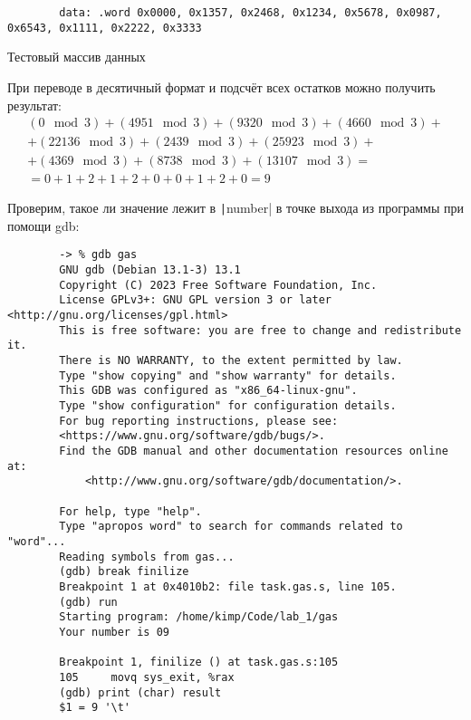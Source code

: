 \documentclass[a4paper]{article}
\begin{document}
  \begin{listing}[H]
    \begin{verbatim}
        data: .word 0x0000, 0x1357, 0x2468, 0x1234, 0x5678, 0x0987, 0x6543, 0x1111, 0x2222, 0x3333
    \end{verbatim}
    \caption{Тестовый массив данных}
  \end{listing}

  При переводе в десятичный формат и подсчёт всех остатков можно получить результат:
  \begin{multline}
    (0\mod 3) +  (4951 \mod 3) + (9320 \mod 3) + (4660 \mod 3) + \\
    + (22136 \mod 3) + (2439 \mod 3) + (25923 \mod 3) + \\
    + (4369 \mod 3) + (8738 \mod 3) + (13107 \mod 3) = \\
    = 0 + 1 + 2 + 1 + 2 + 0 + 0 + 1 + 2 + 0 = 9
  \end{multline}

  Проверим, такое ли значение лежит в \texttt|number|
  в точке выхода из программы при помощи gdb:

  \begin{listing}[H]
    \begin{verbatim}
        -> % gdb gas
        GNU gdb (Debian 13.1-3) 13.1
        Copyright (C) 2023 Free Software Foundation, Inc.
        License GPLv3+: GNU GPL version 3 or later <http://gnu.org/licenses/gpl.html>
        This is free software: you are free to change and redistribute it.
        There is NO WARRANTY, to the extent permitted by law.
        Type "show copying" and "show warranty" for details.
        This GDB was configured as "x86_64-linux-gnu".
        Type "show configuration" for configuration details.
        For bug reporting instructions, please see:
        <https://www.gnu.org/software/gdb/bugs/>.
        Find the GDB manual and other documentation resources online at:
            <http://www.gnu.org/software/gdb/documentation/>.

        For help, type "help".
        Type "apropos word" to search for commands related to "word"...
        Reading symbols from gas...
        (gdb) break finilize 
        Breakpoint 1 at 0x4010b2: file task.gas.s, line 105.
        (gdb) run
        Starting program: /home/kimp/Code/lab_1/gas 
        Your number is 09

        Breakpoint 1, finilize () at task.gas.s:105
        105	    movq sys_exit, %rax
        (gdb) print (char) result 
        $1 = 9 '\t'
    \end{verbatim}
  \end{listing}
\end{document}
